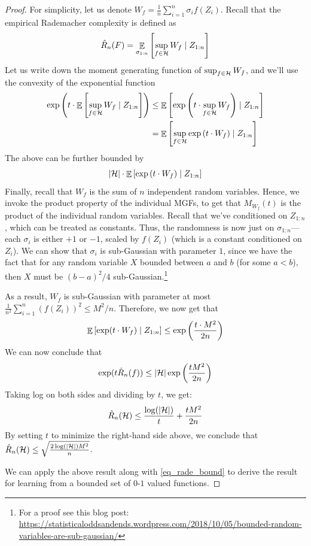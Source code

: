 \begin{proof}
For simplicity, let us denote $W_f = \frac 1 n \sum_{i=1}^n \sigma_i f(Z_i)$.
Recall that the empirical Rademacher complexity is defined as
\[ \hat R_n(F) = \mathop{\mathbb{E}}_{\sigma_{1:n}}\left[ \sup_{f \in \mathcal{H}} W_f \mid Z_{1:n}  \right] \]
Let us write down the moment generating function of $\sup_{f\in\mathcal{H}} W_f$, and we'll use the convexity of the exponential function
\begin{align*}
    \exp\left(t \cdot \mathop{\mathbb{E}}\left[ \sup_{f \in \mathcal{H}} W_f \mid Z_{1:n} \right] \right)
    &\le \mathop{\mathbb{E}}\left[ \exp\left(t \cdot \sup_{f\in \mathcal{H}} W_f \right) \mid Z_{1:n } \right] \\
    &= \mathop{\mathbb{E}}\left[ \sup_{f\in\mathcal{H}} \exp\left(t \cdot W_f \right) \mid Z_{1:n} \right]
\end{align*}
The above can be further bounded by
\begin{align*}
    {\left| {\mathcal{H}} \right|}\cdot \mathop{\mathbb{E}}\left[ \exp\left(t \cdot W_f \right) \mid Z_{1:n} \right]
\end{align*}
Finally, recall that $W_f$ is the sum of $n$ independent random variables.
Hence, we invoke the product property of the individual MGFs, to get that $M_{W_f}(t)$ is the product of the individual random variables.
Recall that we've conditioned on $Z_{1:n}$, which can be treated as constants.
Thus, the randomness is now just on $\sigma_{1:n}$---each $\sigma_i$ is either $+1$ or $-1$, scaled by $f(Z_i)$ (which is a constant conditioned on $Z_i$).
We can show that $\sigma_i$ is sub-Gaussian with parameter $1$, since we have the fact that for any random variable $X$ bounded between $a$ and $b$ (for some $a < b$), then $X$ must be $(b-a)^2/4$ sub-Gaussian.\footnote{For a proof see this blog post: \url{https://statisticaloddsandends.wordpress.com/2018/10/05/bounded-random-variables-are-sub-gaussian/}}

As a result, $W_f$ is sub-Gaussian with parameter at most $\frac 1 {n^2} \sum_{i=1}^n (f(Z_i))^2 \le M^2 / n$.
Therefore, we now get that
\[ \mathop{\mathbb{E}}\left[ \exp(t \cdot W_f) \mid Z_{1:n} \right] \le \exp\left(\frac{t \cdot M^2} {2n}\right) \]
We can now conclude that
\[ \exp(t \hat R_n(f)) \le {\left| {\mathcal{H}} \right|} \exp\left( \frac{t M^2} {2n} \right) \]
Taking log on both sides and dividing by $t$, we get:
\[ \hat R_n(\mathcal{H}) \le \frac{\log({\left| {\mathcal{H}} \right|})} t + \frac{ t M^2} {2n} \]
By setting $t$ to minimize the right-hand side above, we conclude that $\hat R_n(\mathcal{H}) \le \sqrt{\frac {2\log({\left| {\mathcal{H}} \right|}) M^2} {n}}$.

We can apply the above result along with \eqref{eq_rade_bound} to derive the result for learning from a bounded set of $0$-$1$ valued functions.
\end{proof}

